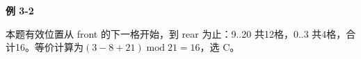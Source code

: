 {\color{ink}\bfseries 例 3-2}\par\vspace{1bp}本题有效位置从 front 的下一格开始，到 rear 为止：9..20 共12格，0..3 共4格，合计16。等价计算为\((3-8+\allowbreak{}21) \operatorname{mod} 21=\allowbreak{}16\)，选 C。
